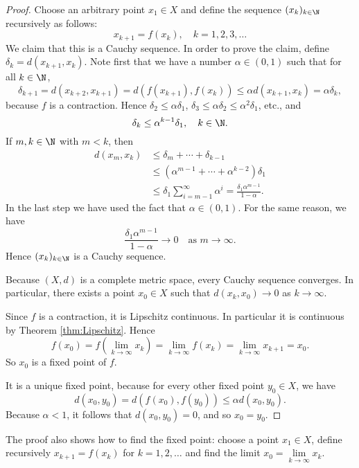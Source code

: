\begin{proof}
Choose an arbitrary point $x_1 \in X$ and define the sequence $(x_k)_{k \in \N}$
recursively as follows:
\[
x_{k + 1} = f(x_k), \quad k = 1,2,3,\ldots
\]
We claim that this is a Cauchy sequence. In order to prove the claim,
define $\delta_k = d(x_{k + 1},x_k)$. Note first
that we have a number $\alpha \in (0,1)$ such that for all $k \in \N$,
\[
\delta_{k +1} = d(x_{k + 2},x_{k + 1}) = d(f(x_{k + 1}),f(x_k)) \le \alpha d(x_{k+ 1},x_k) = \alpha \delta_k,
\]
because $f$ is a contraction. Hence
$\delta_2 \le \alpha \delta_1$,
$\delta_3 \le \alpha \delta_2 \le \alpha^2 \delta_1$,
etc., and
\[
\delta_k \le \alpha^{k - 1} \delta_1, \quad k \in \N.
\]
If $m,k \in \N$ with $m < k$, then
\begin{align*}
d(x_m,x_k) & \le \delta_m + \cdots + \delta_{k - 1} \\
& \le \left(\alpha^{m - 1} + \cdots + \alpha^{k - 2}\right) \delta_1 \\
& \le \delta_1 \sum_{i = m - 1}^\infty \alpha^i = \frac{\delta_1 \alpha^{m - 1}}{1 - \alpha}.
\end{align*}
In the last step we have used the fact that $\alpha \in (0,1)$.
For the same reason, we have
\[
\frac{\delta_1 \alpha^{m - 1}}{1 - \alpha} \to 0 \quad \text{as $m \to \infty$}.
\]
Hence $(x_k)_{k \in \N}$ is a Cauchy sequence.

Because $(X,d)$ is a complete metric space, every Cauchy sequence converges.
In particular, there exists a point $x_0 \in X$ such that $d(x_k,x_0)\to 0$ as
$k \to \infty$.

Since $f$ is a contraction, it is Lipschitz continuous. In particular
it is continuous by Theorem \ref{thm:Lipschitz}. Hence
\[
f(x_0) = f\left(\lim_{k \to \infty} x_k\right) = \lim_{k \to \infty} f(x_k) = \lim_{k \to \infty} x_{k + 1} = x_0.
\]
So $x_0$ is a fixed point of $f$.

It is a unique fixed point, because for every other fixed point $y_0 \in X$,
we have
\[
d(x_0,y_0) = d(f(x_0),f(y_0)) \le \alpha d(x_0,y_0).
\]
Because $\alpha < 1$, it follows that $d(x_0,y_0) = 0$, and so $x_0 = y_0$.
\end{proof}

\bis

\begin{remark}
The proof also shows how to find the fixed point: choose a point $x_1 \in X$,
define recursively $x_{k + 1} = f(x_k)$ for $k = 1,2,\ldots$ and find the
limit $x_0 = \lim\limits_{k \to \infty} x_k.$
\end{remark}




